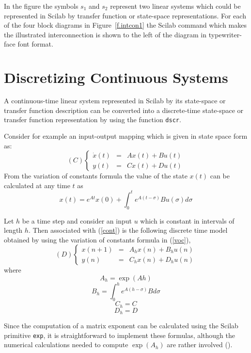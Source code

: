 %
In the figure the symbols $s_1$ and $s_2$ represent two linear systems
which could be represented in Scilab by transfer function or state-space
representations.  For each of the four block diagrams 
in Figure~\ref{f.intcon1}
the Scilab command which makes the illustrated interconnection is shown 
to the left of the diagram
in typewriter-face font format.

\section{Discretizing Continuous Systems}

	A continuous-time linear system represented in Scilab by its
state-space or transfer function description can be converted into 
a discrete-time state-space or transfer function
representation by using the function {\tt dscr}. 

Consider for example an input-output mapping which is
given in state space form as:
%
\begin{equation}
   (C) \left\{ \begin{array}{ccc}
   \dot{x}(t) & = & A x(t) + B u(t) \\
   y(t) & = & C x(t) + D u(t)
   \end{array} \right. 
\label{cont}
\end{equation}
%
From the variation of constants formula the value of the
state $x(t)$ can be calculated at any time $t$ as
%
\begin{equation}
   x(t)=e^{At}x(0)+\int_{0}^{t}e^{A(t-\sigma)}Bu(\sigma)d\sigma
\label{voc}
\end{equation}
%

Let $h$ be a time step and consider an input $u$ 
which is constant in intervals of length $h$.
Then associated with (\ref{cont}) is the following discrete 
time model obtained by using the variation of constants formula in 
(\ref{voc}),
%
\begin{equation}
   (D) \left\{ \begin{array}{ccc}
   x(n+1) & = & A_{h} x(n) + B_{h} u(n)\nonumber \\
   y(n) & = & C_{h} x(n) + D_{h} u(n)
   \end{array} \right. 
\label{disc}
\end{equation}
%
where
$$A_{h}=\exp(Ah)$$
$$B_{h}=\int_{0}^{h}{e^{A(h-\sigma)}Bd\sigma}$$
$$C_{h}=C$$
$$D_{h}=D$$

Since the computation of a matrix exponent can be calculated using
the Scilab primitive {\tt exp}, it is straightforward to implement 
these formulas, although the numerical calculations needed
to compute $\exp(A_h)$ are 
rather involved (\cite{VanLoan}). 

